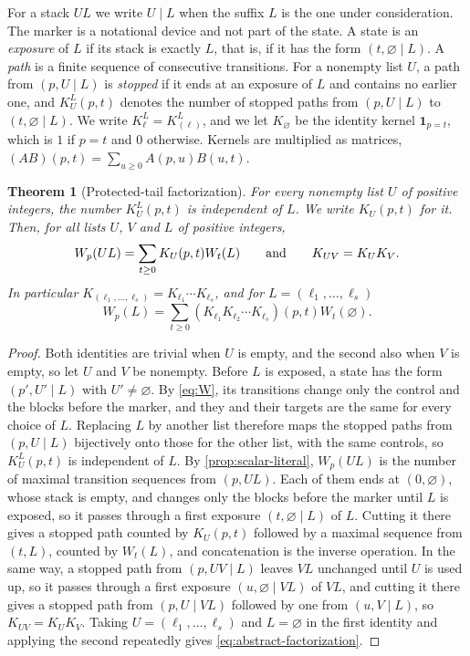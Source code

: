\documentclass[11pt,reqno]{amsart}
\newtheorem{theorem}{Theorem}[section]
\theoremstyle{definition}
\theoremstyle{remark}
\newcommand{\one}{\mathbf 1}
\begin{document}
For a stack $UL$ we write $U\mid L$ when the suffix $L$ is the one under
consideration.  The marker is a notational device and not part of the
state.  A state is an \emph{exposure} of $L$ if its stack is exactly $L$,
that is, if it has the form $(t,\varnothing\mid L)$.  A \emph{path} is a
finite sequence of consecutive transitions.  For a nonempty list $U$, a path
from $(p,U\mid L)$ is \emph{stopped} if it ends at an exposure of $L$ and
contains no earlier one, and $K_U^L(p,t)$ denotes the number of stopped
paths from $(p,U\mid L)$ to $(t,\varnothing\mid L)$.  We write
$K_\ell^L=K_{(\ell)}^L$, and we let $K_\varnothing$ be the identity kernel
$\one_{p=t}$, which is $1$ if $p=t$ and $0$ otherwise.  Kernels are
multiplied as matrices, $(AB)(p,t)=\sum_{u\geq0}A(p,u)B(u,t)$.

\begin{theorem}[Protected-tail factorization]
\label{thm:protected-tail-principle}
For every nonempty list $U$ of positive integers, the number $K_U^L(p,t)$ is
independent of $L$.  We write $K_U(p,t)$ for it.  Then, for all lists $U$,
$V$ and $L$ of positive integers,
\begin{equation}\label{eq:scalar-factorization}
 W_p(UL)=\sum_{t\geq0}K_U(p,t)W_t(L)
 \qquad\hbox{and}\qquad K_{UV}=K_UK_V.
\end{equation}
In particular $K_{(\ell_1,\ldots,\ell_s)}=K_{\ell_1}\cdots K_{\ell_s}$, and
for $L=(\ell_1,\ldots,\ell_s)$
\begin{equation}\label{eq:abstract-factorization}
 W_p(L)=\sum_{t\geq0}(K_{\ell_1}K_{\ell_2}\cdots K_{\ell_s})(p,t)W_t(\varnothing).
\end{equation}
\end{theorem}

\begin{proof}
Both identities are trivial when $U$ is empty, and the second also when
$V$ is empty, so let $U$ and $V$ be nonempty.  Before $L$ is exposed, a state has the form
$(p',U'\mid L)$ with $U'\ne\varnothing$.  By \eqref{eq:W}, its transitions
change only the control and the blocks before the marker, and they and their
targets are the same for every choice of $L$.  Replacing $L$ by another list
therefore maps the stopped paths from $(p,U\mid L)$ bijectively onto those
for the other list, with the same controls, so $K_U^L(p,t)$ is independent
of $L$.  By \cref{prop:scalar-literal}, $W_p(UL)$ is the number of maximal
transition sequences from $(p,UL)$.  Each of them ends at $(0,\varnothing)$,
whose stack is empty, and changes only the blocks before the marker until
$L$ is exposed, so it passes through a first exposure
$(t,\varnothing\mid L)$ of $L$.  Cutting it there gives a stopped path
counted by $K_U(p,t)$ followed by a maximal sequence from $(t,L)$, counted
by $W_t(L)$, and concatenation is the inverse operation.  In the same way, a
stopped path from $(p,UV\mid L)$ leaves $VL$ unchanged until $U$ is used up,
so it passes through a first exposure $(u,\varnothing\mid VL)$ of $VL$, and cutting it there gives a stopped path
from $(p,U\mid VL)$ followed by one from $(u,V\mid L)$, so
$K_{UV}=K_UK_V$.  Taking $U=(\ell_1,\ldots,\ell_s)$ and $L=\varnothing$
in the first identity and applying the second repeatedly gives
\eqref{eq:abstract-factorization}.
\end{proof}
\end{document}

